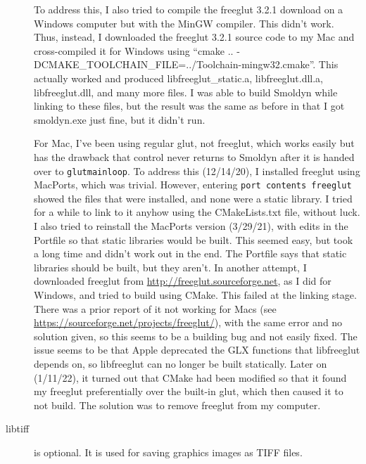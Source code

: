 \documentclass {scrbook}
\newcommand {\ttt} {\texttt}
\begin{document}
\begin{description}
To address this, I also tried to compile the freeglut 3.2.1 download on a Windows computer but with the MinGW compiler. This didn't work. Thus, instead, I downloaded the freeglut 3.2.1 source code to my Mac and cross-compiled it for Windows using ``cmake .. -DCMAKE\_TOOLCHAIN\_FILE=../Toolchain-mingw32.cmake''. This actually worked and produced libfreeglut\_static.a, libfreeglut.dll.a, libfreeglut.dll, and many more files. I was able to build Smoldyn while linking to these files, but the result was the same as before in that I got smoldyn.exe just fine, but it didn't run.

For Mac, I've been using regular glut, not freeglut, which works easily but has the drawback that control never returns to Smoldyn after it is handed over to \ttt{glutmainloop}. To address this (12/14/20), I installed freeglut using MacPorts, which was trivial. However, entering \ttt{port contents freeglut} showed the files that were installed, and none were a static library. I tried for a while to link to it anyhow using the CMakeLists.txt file, without luck. I also tried to reinstall the MacPorts version (3/29/21), with edits in the Portfile so that static libraries would be built. This seemed easy, but took a long time and didn't work out in the end. The Portfile says that static libraries should be built, but they aren't. In another attempt, I downloaded freeglut from \url{http://freeglut.sourceforge.net}, as I did for Windows, and tried to build using CMake. This failed at the linking stage. There was a prior report of it not working for Macs (see \url{https://sourceforge.net/projects/freeglut/}), with the same error and no solution given, so this seems to be a building bug and not easily fixed. The issue seems to be that Apple deprecated the GLX functions that libfreeglut depends on, so libfreeglut can no longer be built statically. Later on (1/11/22), it turned out that CMake had been modified so that it found my freeglut preferentially over the built-in glut, which then caused it to not build. The solution was to remove freeglut from my computer.

\item[libtiff] is optional. It is used for saving graphics images as TIFF files.


\end{description}
\end{document}
